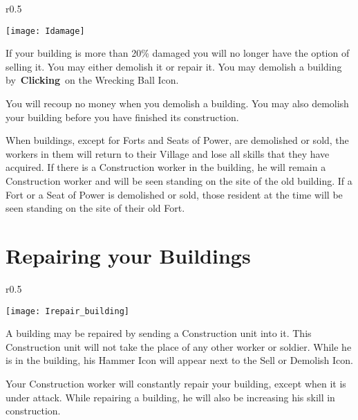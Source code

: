 	
\begin{wrapfigure}{r}{0.5\textwidth}
	\vspace{-20pt}
	\begin{center}
		\texttt{[image: Idamage]}
	\end{center}
	\vspace{-20pt}
\end{wrapfigure}

If your building is more than 20\% damaged you will no longer have the option of selling it. You may either demolish it or repair it. You may demolish a building by \textbf{Clicking} on the Wrecking Ball Icon.

You will recoup no money when you demolish a building. You may also demolish your building before you have finished its construction.

When buildings, except for Forts and Seats of Power, are demolished or sold, the workers in them will return to their Village and lose all skills that they have acquired. If there is a Construction worker in the building, he will remain a Construction worker and will be seen standing on the site of the old building. If a Fort or a Seat of Power is demolished or sold, those resident at the time will be seen standing on the site of their old Fort.

\section{Repairing your Buildings}

	
\begin{wrapfigure}{r}{0.5\textwidth}
	\vspace{-20pt}
	\begin{center}
		\texttt{[image: Irepair\_building]}
	\end{center}
	\vspace{-10pt}
\end{wrapfigure}

A building may be repaired by sending a Construction unit into it. This Construction unit will not take the place of any other worker or soldier. While he is in the building, his Hammer Icon will appear next to the Sell or Demolish Icon.

Your Construction worker will constantly repair your building, except when it is under attack. While repairing a building, he will also be increasing his skill in construction.

